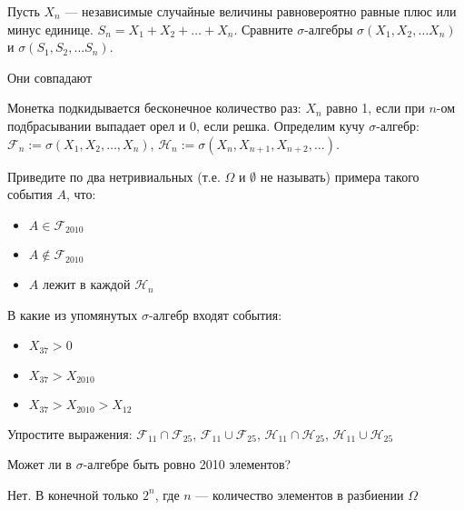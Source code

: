 \begin{problem}
Пусть $X_{n}$ — независимые случайные величины равновероятно равные плюс или минус единице. $S_{n}=X_{1}+X_{2}+\ldots+X_{n}$. Сравните $\sigma$-алгебры $ \sigma(X_{1},X_{2},\ldots X_{n}) $ и $ \sigma(S_{1},S_{2},\ldots S_{n}) $.

\begin{sol}
Они совпадают
\end{sol}
\end{problem}

\begin{problem}
Монетка подкидывается бесконечное количество раз: $X_{n}$ равно 1, если при $ n $-ом подбрасывании выпадает орел и 0, если решка. Определим кучу $ \sigma $-алгебр: $\mathcal{F}_{n}:=\sigma(X_{1},X_{2},\ldots,X_{n})$, $\mathcal{H}_{n}:=\sigma(X_{n},X_{n+1},X_{n+2},\ldots)$.

Приведите по два нетривиальных (т.е. $ \Omega $ и $ \emptyset $ не называть) примера такого события $ A $, что:

\begin{itemize}
\item $ A\in \mathcal{F}_{2010} $
\item $ A\notin \mathcal{F}_{2010} $
\item $A$ лежит в каждой $\mathcal{H}_{n}$
\end{itemize}

В какие из упомянутых $ \sigma $-алгебр входят события:
\begin{itemize}
\item $ X_{37}>0$
\item $ X_{37}>X_{2010}$
\item $ X_{37}>X_{2010}>X_{12}$
\end{itemize}

Упростите выражения: $ \mathcal{F}_{11}\cap \mathcal{F}_{25} $, $ \mathcal{F}_{11}\cup \mathcal{F}_{25} $, $ \mathcal{H}_{11}\cap \mathcal{H}_{25} $, $ \mathcal{H}_{11}\cup \mathcal{H}_{25} $

\begin{sol}

\end{sol}
\end{problem}

\begin{problem}
Может ли в $ \sigma $-алгебре быть ровно 2010 элементов?

\begin{sol}
Нет. В конечной только $ 2^{n} $, где $ n $ — количество элементов в разбиении $ \Omega $
\end{sol}
\end{problem}

